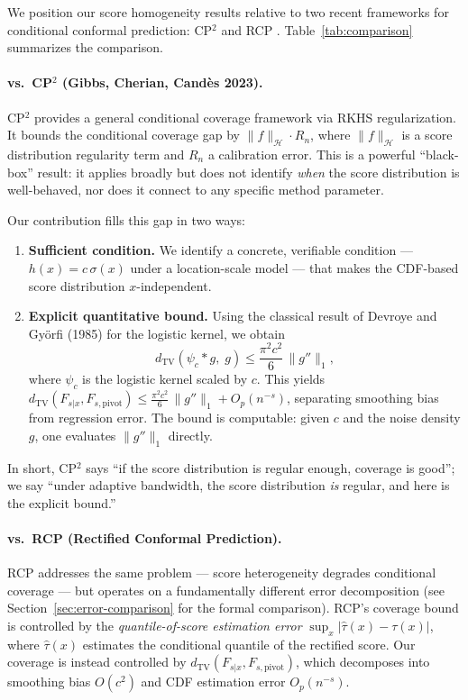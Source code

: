 \documentclass[11pt]{article}
\theoremstyle{remark}
\begin{document}
We position our score homogeneity results relative to two recent
frameworks for conditional conformal prediction: CP$^2$ \cite{CP2}
and RCP \cite{RCP}. Table~\ref{tab:comparison} summarizes the
comparison.

\paragraph{vs.\ CP$^2$ (Gibbs, Cherian, Cand\`{e}s 2023).}
CP$^2$ provides a general conditional coverage framework via RKHS
regularization. It bounds the conditional coverage gap by
$\|f\|_{\mathcal{H}} \cdot R_n$, where $\|f\|_{\mathcal{H}}$ is a
score distribution regularity term and $R_n$ a calibration error.
This is a powerful ``black-box'' result: it applies broadly but does
not identify \emph{when} the score distribution is well-behaved, nor
does it connect to any specific method parameter.

Our contribution fills this gap in two ways:
\begin{enumerate}
  \item \textbf{Sufficient condition.} We identify a concrete,
    verifiable condition --- $h(x) = c\,\sigma(x)$ under a
    location-scale model --- that makes the CDF-based score
    distribution $x$-independent.
  \item \textbf{Explicit quantitative bound.} Using the classical
    result of Devroye and Gy\"{o}rfi (1985) \cite{DG85} for the
    logistic kernel, we obtain
    \[
      d_{\mathrm{TV}}(\psi_c * g,\; g)
        \le \frac{\pi^2 c^2}{6}\,\|g''\|_1,
    \]
    where $\psi_c$ is the logistic kernel scaled by $c$. This yields
    $d_{\mathrm{TV}}(F_{s|x}, F_{s,\mathrm{pivot}})
      \le \frac{\pi^2 c^2}{6}\,\|g''\|_1 + O_p(n^{-s})$,
    separating smoothing bias from regression error.
    The bound is computable: given $c$ and the noise density $g$, one
    evaluates $\|g''\|_1$ directly.
\end{enumerate}

In short, CP$^2$ says ``if the score distribution is regular enough,
coverage is good''; we say ``under adaptive bandwidth, the score
distribution \emph{is} regular, and here is the explicit bound.''

\paragraph{vs.\ RCP (Rectified Conformal Prediction).}
RCP addresses the same problem --- score heterogeneity degrades
conditional coverage --- but operates on a fundamentally different
error decomposition (see Section~\ref{sec:error-comparison} for the
formal comparison). RCP's coverage bound is controlled by the
\emph{quantile-of-score estimation error}
$\sup_x |\hat\tau(x) - \tau(x)|$, where $\hat\tau(x)$ estimates the
conditional quantile of the rectified score. Our coverage is instead
controlled by $d_{\mathrm{TV}}(F_{s|x}, F_{s,\mathrm{pivot}})$, which
decomposes into smoothing bias $O(c^2)$ and CDF estimation error
$O_p(n^{-s})$.
\end{document}
